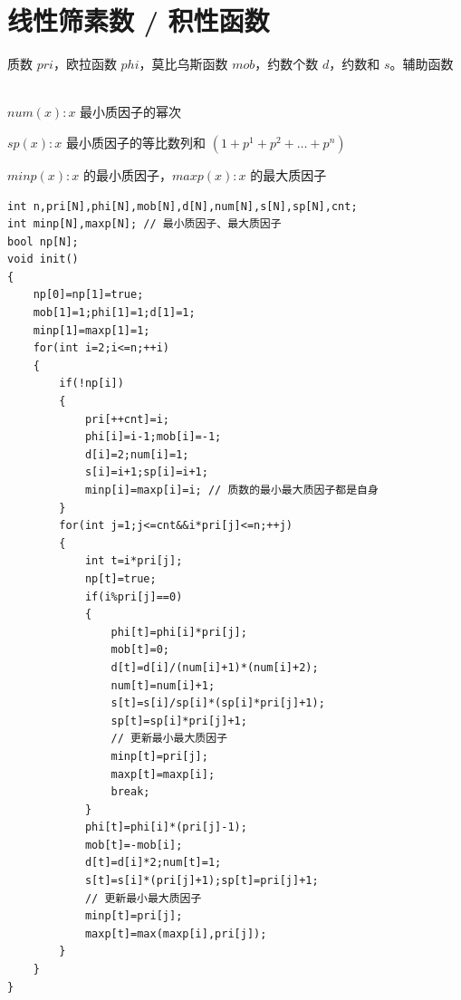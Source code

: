 \section{线性筛素数 / 积性函数}
\par \noindent 质数 $pri$，欧拉函数 $phi$，莫比乌斯函数 $mob$，约数个数 $d$，约数和 $s$。辅助函数
~\\
\par \noindent $num(x):x$ 最小质因子的幂次
~\\
\par \noindent $sp(x):x$ 最小质因子的等比数列和 $\left(1+p^1+p^2+\ldots+p^n\right)$
~\\
\par \noindent $minp(x):x$ 的最小质因子，$maxp(x):x$ 的最大质因子
\begin{verbatim}
int n,pri[N],phi[N],mob[N],d[N],num[N],s[N],sp[N],cnt;
int minp[N],maxp[N]; // 最小质因子、最大质因子
bool np[N];
void init()
{
    np[0]=np[1]=true;
    mob[1]=1;phi[1]=1;d[1]=1;
    minp[1]=maxp[1]=1;
    for(int i=2;i<=n;++i)
    {
        if(!np[i])
        {
            pri[++cnt]=i;
            phi[i]=i-1;mob[i]=-1;
            d[i]=2;num[i]=1;
            s[i]=i+1;sp[i]=i+1;
            minp[i]=maxp[i]=i; // 质数的最小最大质因子都是自身
        }
        for(int j=1;j<=cnt&&i*pri[j]<=n;++j)
        {
            int t=i*pri[j];
            np[t]=true;
            if(i%pri[j]==0)
            {
                phi[t]=phi[i]*pri[j];
                mob[t]=0;
                d[t]=d[i]/(num[i]+1)*(num[i]+2);
                num[t]=num[i]+1;
                s[t]=s[i]/sp[i]*(sp[i]*pri[j]+1);
                sp[t]=sp[i]*pri[j]+1;
                // 更新最小最大质因子
                minp[t]=pri[j];
                maxp[t]=maxp[i];
                break;
            }
            phi[t]=phi[i]*(pri[j]-1);
            mob[t]=-mob[i];
            d[t]=d[i]*2;num[t]=1;
            s[t]=s[i]*(pri[j]+1);sp[t]=pri[j]+1;
            // 更新最小最大质因子
            minp[t]=pri[j];
            maxp[t]=max(maxp[i],pri[j]);
        }
    }
}
\end{verbatim}
